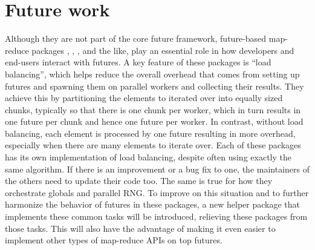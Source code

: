 \section{Future work}
\label{future-work}

Although they are not part of the core future framework, future-based
map-reduce packages , , ,
and the like, play an essential role in how developers and end-users
interact with futures.  A key feature of these packages is ``load
balancing'', which helps reduce the overall overhead that comes from
setting up futures and spawning them on parallel workers and
collecting their results.  They achieve this by partitioning the
elements to iterated over into equally sized chunks, typically so that
there is one chunk per worker, which in turn results in one future per
chunk and hence one future per worker.  In contrast, without load
balancing, each element is processed by one future resulting in more
overhead, especially when there are many elements to iterate over.
Each of these packages has its own implementation of load balancing,
despite often using exactly the same algorithm.  If there is an
improvement or a bug fix to one, the maintainers of the others need to
update their code too.  The same is true for how they orchestrate
globals and parallel RNG.  To improve on this situation and to further
harmonize the behavior of futures in these packages, a new helper
package  that implements these common tasks will
be introduced, relieving these packages from those tasks.  This will
also have the advantage of making it even easier to implement other
types of map-reduce APIs on top futures.

